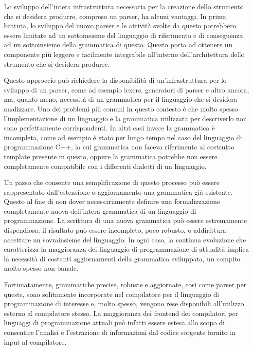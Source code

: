 Lo sviluppo dell’intera infrastruttura necessaria per la creazione dello
strumento che si desidera produrre, compreso un parser, ha alcuni vantaggi. In
prima battuta, lo sviluppo del nuovo parser e le attività svolte da questo
potrebbero essere limitate ad un sottoinsieme del linguaggio di riferimento e di
conseguenza ad un sottoinsieme della grammatica di questo. Questo porta ad
ottenere un componente più leggero e facilmente integrabile all'interno
dell'architettura dello strumento che si desidera produrre.

Questo approccio può richiedere la disponibilità di un’infrastruttura per lo
sviluppo di un parser, come ad esempio lexers, generatori di parser e altro
ancora, ma, quanto meno, necessità di un grammatica per il linguaggio che si
desidera analizzare. Uno dei problemi più comuni in questo contesto è che molto
spesso l’implementazione di un linguaggio e la grammatica utilizzata per
descriverlo non sono perfettamente corrispondenti. In altri casi invece la
grammatica è incompleta, come ad esempio è stato per lungo tempo nel caso del
linguaggio di programmazione C++, la cui grammatica non faceva riferimento al
costrutto template presente in questo, oppure la grammatica potrebbe non essere
completamente compatibile con i differenti dialetti di un linguaggio.

Un passo che consente una semplificazione di questo processo può essere
rappresentato dall'estensione o aggiornamento una grammatica già esistente.
Questo al fine di non dover necessariamente definire una formalizzazione
completamente nuova dell'intera grammatica di un linguaggio di programmazione.
La scrittura di una nuova grammatica può essere estremamente dispendiosa; il
risultato può essere incompleto, poco robusto, o addirittura accettare un
sovrainsieme del linguaggio. In ogni caso, la continua evoluzione che
caratterizza la maggioranza dei linguaggio di programmazione di attualità
implica la necessità di costanti aggiornamenti della grammatica sviluppata, un
compito molto spesso non banale.

Fortunatamente, grammatiche precise, robuste e aggiornate, così come parser per
queste, sono solitamente incorporate nel compilatore per il linguaggio di
programmazione di interesse e, molto spesso, vengono rese disponibili
all’utilizzo esterno al compilatore stesso. La maggioranza dei frontend dei
compilatori per linguaggi di programmazione attuali può infatti essere estesa
allo scopo di consentire l’analisi e l’estrazione di informazioni dal codice
sorgente fornito in input al compilatore. \cite{gregor2012}

